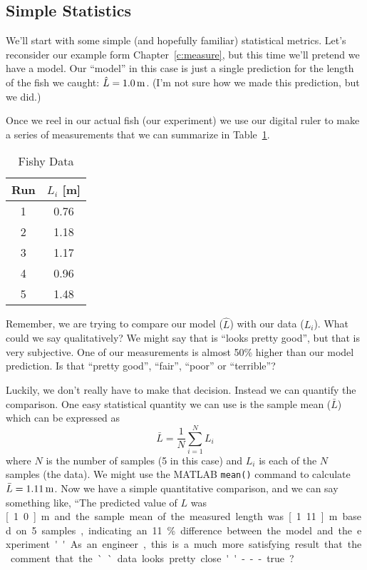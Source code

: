 \subsection{Simple Statistics}
We'll start with some simple (and hopefully familiar) statistical metrics.  Let's reconsider our example form Chapter~\ref{c:measure}, but this time we'll pretend we have a model.  Our ``model'' in this case is just a single prediction for the length of the fish we caught: $\hat{L}=\unit[1.0]{m}$.  (I'm not sure how we made this prediction, but we did.)  

Once we reel in our actual fish (our experiment) we use our digital ruler to make a series of measurements that we can summarize in Table~\ref{t:fishdata}. 
\begin{table}[bt!] 
\renewcommand{\arraystretch}{1.2}
\caption{Fishy Data}
\label{t:fishdata}
\centering
\begin{tabular}{|c|c|}\hline
Run & $L_i$ [m] \\ \hline \hline
1 & 0.76 \\ \hline
2 & 1.18 \\ \hline
3 & 1.17 \\ \hline
4 & 0.96 \\ \hline
5 & 1.48 \\ \hline
\end{tabular}
\end{table}
Remember, we are trying to compare our model ($\hat{L}$) with our data ($L_i$).  What could we say qualitatively?  We might say that is ``looks pretty good'', but that is very subjective.  One of our measurements is almost 50\% higher than our model prediction.  Is that ``pretty good'', ``fair'', ``poor'' or ``terrible''?

Luckily, we don't really have to make that decision.  Instead we can quantify the comparison.  One easy statistical quantity we can use is the \gls{sample mean} ($\bar{L}$) which can be expressed as
\begin{equation}\label{e:mean}
\bar{L} = \frac{1}{N}\sum_{i=1}^{N} L_i
\end{equation}
where $N$ is the number of samples (5 in this case) and $L_i$ is each of the $N$ samples (the data).  We might use the MATLAB \texttt{mean()} command to calculate $\bar{L}=\unit[1.11]{m}$.  Now we have a simple quantitative comparison, and we can say something like, ``The predicted value of $L$ was \unit[1.0]{m} and the sample mean of the measured length was \unit[1.11]{m} based on 5 samples, indicating an 11\% difference between the model and the experiment.''  As an engineer, this is a much more satisfying result that the comment that the ``data looks pretty close''---true?

